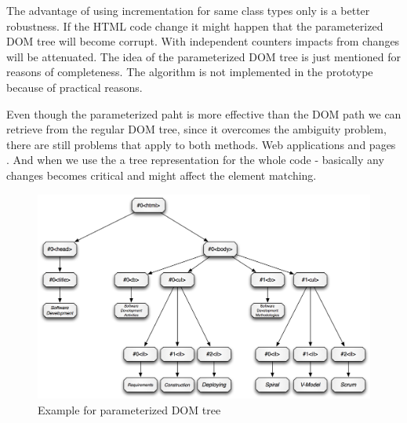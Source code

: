 The advantage of using incrementation for same class types only is a better robustness. If the HTML code change it might happen that the parameterized DOM tree will become corrupt. With independent counters impacts from changes will be attenuated. 
The idea of the parameterized DOM tree is just mentioned for reasons of completeness. The algorithm is not implemented in the prototype because of practical reasons. 

Even though the parameterized paht is more effective than the DOM path we can retrieve from the regular DOM tree, since it overcomes the ambiguity problem, there are still problems that apply to both methods. Web applications and pages . And when we use the a tree representation for the whole code - basically any changes becomes critical and might affect the element matching. 

\begin{figure}[h!] \centering
		\includegraphics[width=13cm]{images/dom-paramaterized-tree-example.png}
		\caption{Example for parameterized DOM tree}
		\label{dom-paramaterized-tree-example}
\end{figure} 
